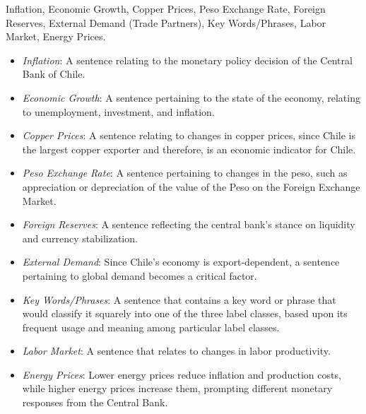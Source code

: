  Inflation, Economic Growth, Copper Prices, Peso Exchange Rate, Foreign Reserves, External Demand (Trade Partners), Key Words/Phrases, Labor Market, Energy Prices. 

\begin{itemize}
    \item \emph{Inflation}: A sentence relating to the monetary policy decision of the Central Bank of Chile.
    
    \item \emph{Economic Growth}: A sentence pertaining to the state of the economy, relating to unemployment, investment, and inflation.
    
    \item \emph{Copper Prices}: A sentence relating to changes in copper prices, since Chile is the largest copper exporter and therefore, is an economic indicator for Chile.
    
    \item \emph{Peso Exchange Rate}: A sentence pertaining to changes in the peso, such as appreciation or depreciation of the value of the Peso on the Foreign Exchange Market.
    
    \item \emph{Foreign Reserves}: A sentence reflecting the central bank’s stance on liquidity and currency stabilization.
    
    \item \emph{External Demand}: Since Chile’s economy is export-dependent, a sentence pertaining to global demand becomes a critical factor.
    
    \item \emph{Key Words/Phrases}: A sentence that contains a key word or phrase that would classify it squarely into one of the three label classes, based upon its frequent usage and meaning among particular label classes.
    
    \item \emph{Labor Market}: A sentence that relates to changes in labor productivity.
    
    \item \emph{Energy Prices}: Lower energy prices reduce inflation and production costs, while higher energy prices increase them, prompting different monetary responses from the Central Bank.
\end{itemize}

